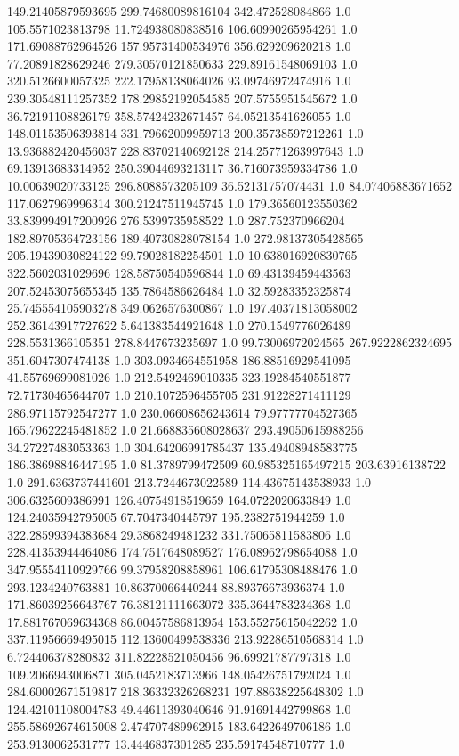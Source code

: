 149.21405879593695	299.74680089816104	342.472528084866	1.0
105.5571023813798	11.724938080838516	106.60990265954261	1.0
171.69088762964526	157.95731400534976	356.629209620218	1.0
77.20891828629246	279.30570121850633	229.89161548069103	1.0
320.5126600057325	222.17958138064026	93.09746972474916	1.0
239.30548111257352	178.29852192054585	207.5755951545672	1.0
36.72191108826179	358.57424232671457	64.05213541626055	1.0
148.01153506393814	331.79662009959713	200.35738597212261	1.0
13.936882420456037	228.83702140692128	214.25771263997643	1.0
69.13913683314952	250.39044693213117	36.716073959334786	1.0
10.00639020733125	296.8088573205109	36.52131757074431	1.0
84.07406883671652	117.0627969996314	300.21247511945745	1.0
179.36560123550362	33.839994917200926	276.5399735958522	1.0
287.752370966204	182.89705364723156	189.40730828078154	1.0
272.98137305428565	205.19439030824122	99.79028182254501	1.0
10.638016920830765	322.5602031029696	128.58750540596844	1.0
69.43139459443563	207.52453075655345	135.7864586626484	1.0
32.59283352325874	25.745554105903278	349.0626576300867	1.0
197.40371813058002	252.36143917727622	5.641383544921648	1.0
270.1549776026489	228.5531366105351	278.8447673235697	1.0
99.73006972024565	267.9222862324695	351.6047307474138	1.0
303.0934664551958	186.88516929541095	41.55769699081026	1.0
212.5492469010335	323.19284540551877	72.71730465644707	1.0
210.1072596455705	231.91228271411129	286.97115792547277	1.0
230.06608656243614	79.97777704527365	165.79622245481852	1.0
21.668835608028637	293.49050615988256	34.27227483053363	1.0
304.64206991785437	135.49408948583775	186.38698846447195	1.0
81.3789799472509	60.985325165497215	203.63916138722	1.0
291.6363737441601	213.7244673022589	114.43675143538933	1.0
306.6325609386991	126.40754918519659	164.0722020633849	1.0
124.24035942795005	67.7047340445797	195.2382751944259	1.0
322.28599394383684	29.3868249481232	331.75065811583806	1.0
228.41353944464086	174.7517648089527	176.08962798654088	1.0
347.95554110929766	99.37958208858961	106.61795308488476	1.0
293.1234240763881	10.86370066440244	88.89376673936374	1.0
171.86039256643767	76.38121111663072	335.3644783234368	1.0
17.881767069634368	86.00457586813954	153.55275615042262	1.0
337.11956669495015	112.13600499538336	213.92286510568314	1.0
6.724406378280832	311.82228521050456	96.69921787797318	1.0
109.2066943006871	305.0452183713966	148.05426751792024	1.0
284.60002671519817	218.36332326268231	197.88638225648302	1.0
124.42101108004783	49.44611393040646	91.91691442799868	1.0
255.58692674615008	2.474707489962915	183.6422649706186	1.0
253.9130062531777	13.4446837301285	235.59174548710777	1.0

